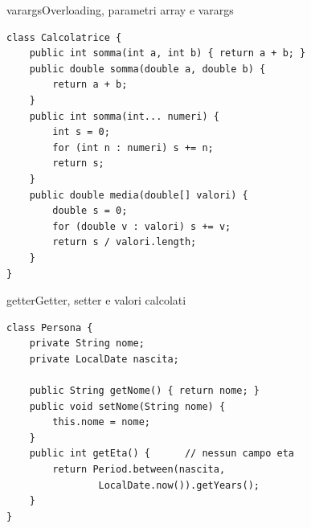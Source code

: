\begin{caso}{varargs}{Overloading, parametri array e varargs}
\begin{lstlisting}[style=javacs]
class Calcolatrice {
    public int somma(int a, int b) { return a + b; }
    public double somma(double a, double b) {
        return a + b;
    }
    public int somma(int... numeri) {
        int s = 0;
        for (int n : numeri) s += n;
        return s;
    }
    public double media(double[] valori) {
        double s = 0;
        for (double v : valori) s += v;
        return s / valori.length;
    }
}
\end{lstlisting}
\tcblower
{}
\end{caso}

\begin{caso}{getter}{Getter, setter e valori calcolati}
\begin{lstlisting}[style=javacs]
class Persona {
    private String nome;
    private LocalDate nascita;

    public String getNome() { return nome; }
    public void setNome(String nome) {
        this.nome = nome;
    }
    public int getEta() {      // nessun campo eta
        return Period.between(nascita,
                LocalDate.now()).getYears();
    }
}
\end{lstlisting}
\tcblower
{}
\end{caso}

